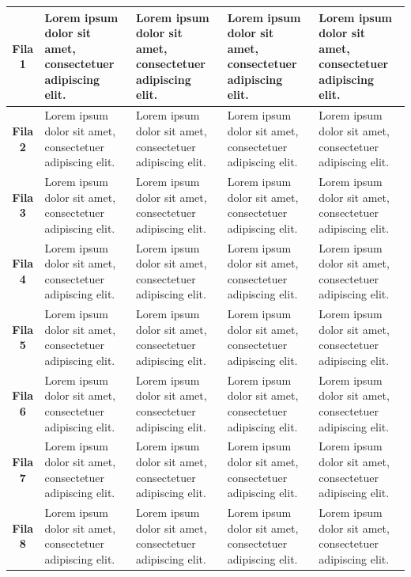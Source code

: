 \begin{longtable}{p{2cm}|p{3cm}|p{3cm}|p{3cm}|p{3cm}|}
    \multicolumn{1}{|c|}{\textbf{Fila 1}} & Lorem ipsum dolor sit amet, consectetuer adipiscing elit. & Lorem ipsum dolor sit amet, consectetuer adipiscing elit. & Lorem ipsum dolor sit amet, consectetuer adipiscing elit. & Lorem ipsum dolor sit amet, consectetuer adipiscing elit. \\ \hline
    \multicolumn{1}{|c|}{\textbf{Fila 2}} & Lorem ipsum dolor sit amet, consectetuer adipiscing elit. & Lorem ipsum dolor sit amet, consectetuer adipiscing elit. & Lorem ipsum dolor sit amet, consectetuer adipiscing elit. & Lorem ipsum dolor sit amet, consectetuer adipiscing elit. \\ \hline
    \multicolumn{1}{|c|}{\textbf{Fila 3}} & Lorem ipsum dolor sit amet, consectetuer adipiscing elit. & Lorem ipsum dolor sit amet, consectetuer adipiscing elit. & Lorem ipsum dolor sit amet, consectetuer adipiscing elit. & Lorem ipsum dolor sit amet, consectetuer adipiscing elit. \\ \hline
    \multicolumn{1}{|c|}{\textbf{Fila 4}} & Lorem ipsum dolor sit amet, consectetuer adipiscing elit. & Lorem ipsum dolor sit amet, consectetuer adipiscing elit. & Lorem ipsum dolor sit amet, consectetuer adipiscing elit. & Lorem ipsum dolor sit amet, consectetuer adipiscing elit. \\ \hline
    \multicolumn{1}{|c|}{\textbf{Fila 5}} & Lorem ipsum dolor sit amet, consectetuer adipiscing elit. & Lorem ipsum dolor sit amet, consectetuer adipiscing elit. & Lorem ipsum dolor sit amet, consectetuer adipiscing elit. & Lorem ipsum dolor sit amet, consectetuer adipiscing elit. \\ \hline
    \multicolumn{1}{|c|}{\textbf{Fila 6}} & Lorem ipsum dolor sit amet, consectetuer adipiscing elit. & Lorem ipsum dolor sit amet, consectetuer adipiscing elit. & Lorem ipsum dolor sit amet, consectetuer adipiscing elit. & Lorem ipsum dolor sit amet, consectetuer adipiscing elit. \\ \hline  
    \multicolumn{1}{|c|}{\textbf{Fila 7}} & Lorem ipsum dolor sit amet, consectetuer adipiscing elit. & Lorem ipsum dolor sit amet, consectetuer adipiscing elit. & Lorem ipsum dolor sit amet, consectetuer adipiscing elit. & Lorem ipsum dolor sit amet, consectetuer adipiscing elit. \\ \hline    
    \multicolumn{1}{|c|}{\textbf{Fila 8}} & Lorem ipsum dolor sit amet, consectetuer adipiscing elit. & Lorem ipsum dolor sit amet, consectetuer adipiscing elit. & Lorem ipsum dolor sit amet, consectetuer adipiscing elit. & Lorem ipsum dolor sit amet, consectetuer adipiscing elit. \\ \hline    

\end{longtable}
